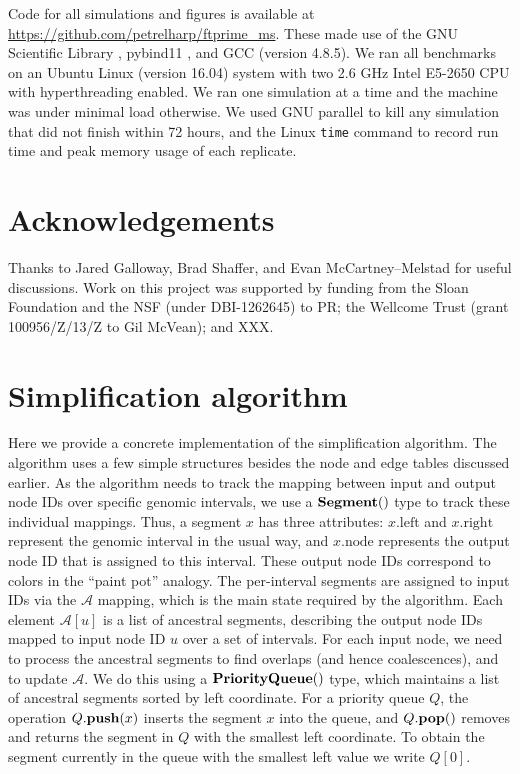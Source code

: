 \documentclass{article}
\newcommand{\Al}{\mathcal{A}}  %
\newcommand{\priorityq}[1]{\mbox{\textbf{PriorityQueue}}({#1})}
\newcommand{\pqpush}[2]{#1.\mbox{\textbf{push}}(#2)}
\newcommand{\pqpop}[1]{#1.\mbox{\textbf{pop}}()}
\newcommand{\ancsegment}[1]{\mbox{\textbf{Segment}}(#1)}
\newcommand{\attrleft}[1]{#1.\mbox{left}}
\newcommand{\attrright}[1]{#1.\mbox{right}}
\newcommand{\attrnode}[1]{#1.\mbox{node}}
\begin{document}
Code for all simulations and figures is available at \url{https://github.com/petrelharp/ftprime_ms}.
These made use of the GNU Scientific Library \citep[version 1.16][]{galassi2018scientific},
pybind11 \citep[version 2.2.1][]{pybind11},
and GCC (version 4.8.5).
We ran all benchmarks on an Ubuntu Linux (version 16.04) system with two 2.6 GHz Intel E5-2650 CPU with
hyperthreading enabled.
We ran one simulation at a time and the machine was under minimal load otherwise.
We used GNU parallel \citep{Tange2011a} to kill any simulation that did not finish within 72 hours,
and the Linux \texttt{time} command to record run time and peak memory usage of each replicate.


\section*{Acknowledgements}
Thanks to Jared Galloway, Brad Shaffer, and Evan McCartney--Melstad for useful discussions.
Work on this project was supported by funding from
the Sloan Foundation and the NSF (under DBI-1262645) to PR;
the Wellcome Trust (grant 100956/Z/13/Z to Gil McVean);
and XXX.



\appendix

\section{Simplification algorithm}
\label{ss:simplify_algorithm}

Here we provide a concrete implementation of the simplification algorithm.
The algorithm uses a few simple structures
besides the node and edge tables discussed earlier. As the algorithm needs to track the mapping
between input and output node IDs over specific genomic intervals, we use a $\ancsegment$
type to track these individual mappings. Thus, a segment $x$ has three attributes:
$\attrleft{x}$ and $\attrright{x}$ represent the genomic interval in the usual way,
and $\attrnode{x}$ represents the output node ID that is assigned to this interval.
These output node IDs correspond to colors in the ``paint pot'' analogy.
The per-interval segments are assigned to input IDs via the $\Al$ mapping,
which is the main state required by the algorithm. Each element $\Al[u]$
is a list of ancestral segments, describing the output node IDs mapped to input
node ID $u$ over a set of intervals.
For each input node, we need to process the ancestral segments
to find overlaps (and hence coalescences), and to update $\Al$.
We do this using a $\priorityq{}$ type, which maintains a list of ancestral
segments sorted by left coordinate. For a priority queue $Q$, the operation
$\pqpush{Q}{x}$ inserts the segment $x$ into the queue, and $\pqpop{Q}$
removes and returns the segment in $Q$ with the smallest left coordinate.
To obtain the segment currently in the queue with the smallest left value we
write $Q[0]$.
\end{document}
